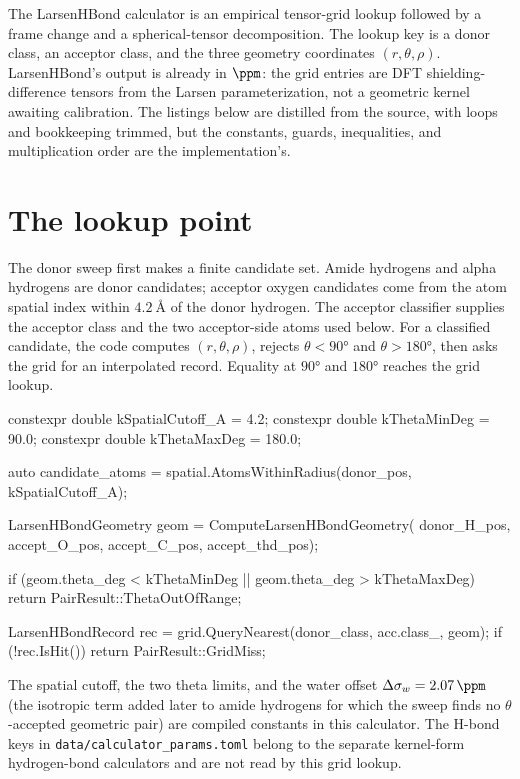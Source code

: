 \documentclass[11pt]{article}
\newcommand{\code}[1]{\texttt{#1}}
\begin{document}

The LarsenHBond calculator is an empirical tensor-grid lookup followed by a
frame change and a spherical-tensor decomposition. The lookup key is a donor
class, an acceptor class, and the three geometry coordinates
\((r,\theta,\rho)\). LarsenHBond's output is already in \(\si{\ppm}\): the
grid entries are DFT shielding-difference tensors from the Larsen
parameterization, not a geometric kernel awaiting calibration. The listings
below are distilled from the source, with loops and bookkeeping trimmed, but
the constants, guards, inequalities, and multiplication order are the
implementation's.

\section{The lookup point}

The donor sweep first makes a finite candidate set. Amide hydrogens and alpha
hydrogens are donor candidates; acceptor oxygen candidates come from the atom
spatial index within \(\SI{4.2}{\angstrom}\) of the donor hydrogen. The
acceptor classifier supplies the acceptor class and the two acceptor-side
atoms used below. For a classified candidate, the code computes
\((r,\theta,\rho)\), rejects \(\theta<\ang{90}\) and
\(\theta>\ang{180}\), then asks the grid for an interpolated record. Equality
at \(\ang{90}\) and \(\ang{180}\) reaches the grid lookup.

\begin{codebox}
constexpr double kSpatialCutoff_A = 4.2;
constexpr double kThetaMinDeg     = 90.0;
constexpr double kThetaMaxDeg     = 180.0;

auto candidate_atoms =
    spatial.AtomsWithinRadius(donor_pos, kSpatialCutoff_A);

LarsenHBondGeometry geom = ComputeLarsenHBondGeometry(
    donor_H_pos, accept_O_pos, accept_C_pos, accept_thd_pos);

if (geom.theta_deg < kThetaMinDeg || geom.theta_deg > kThetaMaxDeg)
    return PairResult::ThetaOutOfRange;

LarsenHBondRecord rec = grid.QueryNearest(donor_class, acc.class_, geom);
if (!rec.IsHit()) return PairResult::GridMiss;
\end{codebox}

The spatial cutoff, the two theta limits, and the water offset
\(\Delta\sigma_w=\SI{2.07}{\ppm}\) (the isotropic term added later to amide
hydrogens for which the sweep finds no \(\theta\)-accepted geometric pair) are
compiled constants in this calculator.
The H-bond keys in \code{data/calculator\_params.toml} belong to the separate
kernel-form hydrogen-bond calculators and are not read by this grid lookup.
\end{document}
